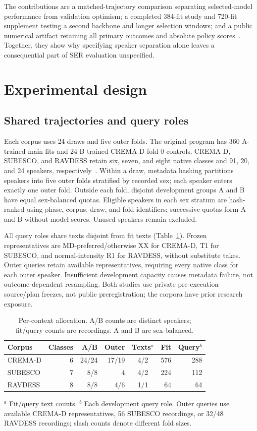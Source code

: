 \documentclass[letterpaper]{article}
\begin{document}
The contributions are a matched-trajectory comparison separating selected-model performance from validation optimism; a completed 384-fit study and 720-fit supplement testing a second backbone and longer selection windows; and a public numerical artifact retaining all primary outcomes and absolute policy scores~\cite{artifact}. Together, they show why specifying speaker separation alone leaves a consequential part of SER evaluation unspecified.

\section{Experimental design}
\subsection{Shared trajectories and query roles}
Each corpus uses 24 draws and five outer folds. The original program has 360 A-trained main fits and 24 B-trained CREMA-D fold-0 controls. CREMA-D, SUBESCO, and RAVDESS retain six, seven, and eight native classes and 91, 20, and 24 speakers, respectively~\cite{cremad,subesco,ravdess}. Within a draw, metadata hashing partitions speakers into five outer folds stratified by recorded sex; each speaker enters exactly one outer fold. Outside each fold, disjoint development groups A and B have equal sex-balanced quotas. Eligible speakers in each sex stratum are hash-ranked using phase, corpus, draw, and fold identifiers; successive quotas form A and B without model scores. Unused speakers remain excluded.

All query roles share texts disjoint from fit texts (Table~\ref{tab:panels}). Frozen representatives are MD-preferred/otherwise XX for CREMA-D, T1 for SUBESCO, and normal-intensity R1 for RAVDESS, without substitute takes. Outer queries retain available representatives, requiring every native class for each outer speaker. Insufficient development capacity causes metadata failure, not outcome-dependent resampling. Both studies use private pre-execution source/plan freezes, not public preregistration; the corpora have prior research exposure.

\begin{table}[t]
\centering\small
\caption{Per-context allocation. A/B counts are distinct speakers; fit/query counts are recordings. A and B are sex-balanced.}
\label{tab:panels}
\setlength{\tabcolsep}{3pt}
\begin{tabular}{lrrrcrr}\toprule
Corpus & Classes & A/B & Outer & Texts$^a$ & Fit & Query$^b$\\\midrule
CREMA-D & 6 & 24/24 & 17/19 & 4/2 & 576 & 288\\
SUBESCO & 7 & 8/8 & 4 & 4/2 & 224 & 112\\
RAVDESS & 8 & 8/8 & 4/6 & 1/1 & 64 & 64\\\bottomrule
\end{tabular}
\par\raggedright\small
$^a$ Fit/query text counts. $^b$ Each development query role. Outer queries use available CREMA-D representatives, 56 SUBESCO recordings, or 32/48 RAVDESS recordings; slash counts denote different fold sizes.
\end{table}
\end{document}
